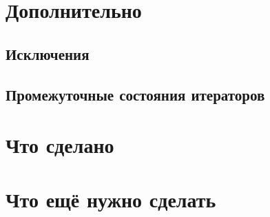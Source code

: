 \section{Дополнительно}

\subsection{Исключения}


\subsection{Промежуточные состояния итераторов}



\section{Что сделано}



\section{Что ещё нужно сделать}
